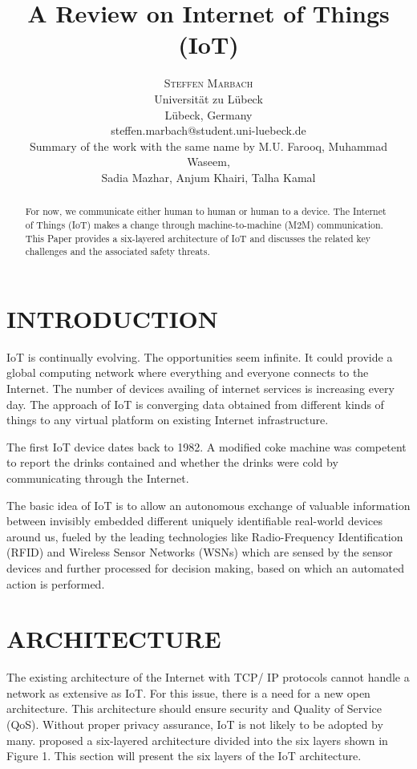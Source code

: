 \documentclass[twoside,twocolumn]{article}
\title{\textbf{A Review on Internet of Things (IoT)}}
\author{
    \textsc{Steffen Marbach} \\[0.5ex]
    \normalsize Universität zu Lübeck \\
    \normalsize Lübeck, Germany \\
    \normalsize steffen.marbach@student.uni-luebeck.de \\[1.5ex]
    \normalsize Summary of the work with the same name by M.U. Farooq, Muhammad Waseem, \\
    \normalsize Sadia Mazhar, Anjum Khairi, Talha Kamal \cite{AReViewOnInternetOfThings}
}
\date{}
\begin{document}
\maketitle

\begin{abstract}
   \noindent For now, we communicate either human to human or human to a device. The Internet of Things (IoT) makes a change through machine-to-machine (M2M) communication. This Paper provides a six-layered architecture of IoT and discusses the related key challenges and the associated safety threats.
\end{abstract}

\section{INTRODUCTION}
    \noindent IoT is continually evolving. The opportunities seem infinite. It could provide a global computing network where everything and everyone connects to the Internet. The number of devices availing of internet services is increasing every day. The approach of IoT is converging data obtained from different kinds of things to any virtual platform on existing Internet infrastructure.

    The first IoT device dates back to 1982. A modified coke machine was competent to report the drinks contained and whether the drinks were cold by communicating through the Internet\cite{CokeMachine}.
    
    The basic idea of IoT is to allow an autonomous exchange of valuable information between invisibly embedded different uniquely identifiable real-world devices around us, fueled by the leading technologies like Radio-Frequency Identification (RFID) and Wireless Sensor Networks (WSNs) which are sensed by the sensor devices and further processed for decision making, based on which an automated action is performed.
    
\section{ARCHITECTURE}
    \noindent The existing architecture of the Internet with TCP/ IP protocols cannot handle a network as extensive as IoT. For this issue, there is a need for a new open architecture. This architecture should ensure security and Quality of Service (QoS). Without proper privacy assurance, IoT is not likely to be adopted by many. \cite{ArchitectureIoT} proposed a six-layered architecture divided into the six layers shown in Figure 1. This section will present the six layers of the IoT architecture.
\end{document}
